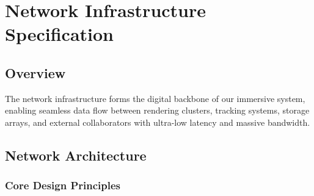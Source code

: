 \chapter{Network Infrastructure Specification}

\section{Overview}

The network infrastructure forms the digital backbone of our immersive system, enabling seamless data flow between rendering clusters, tracking systems, storage arrays, and external collaborators with ultra-low latency and massive bandwidth.

\section{Network Architecture}

\subsection{Core Design Principles}

